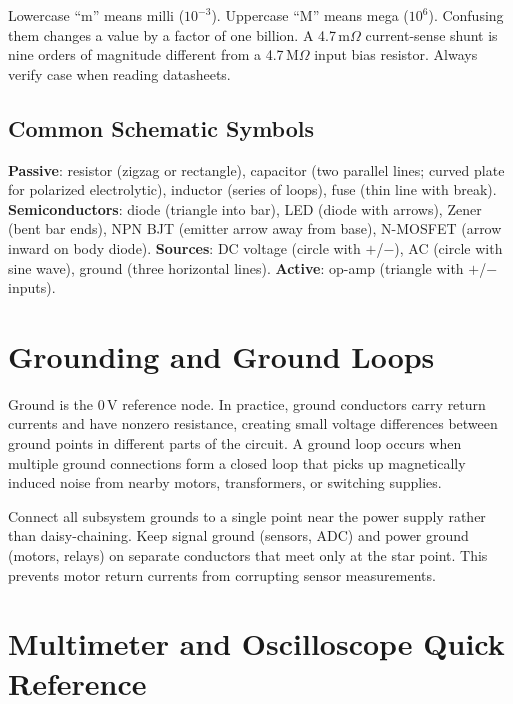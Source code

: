 \documentclass[11pt,letterpaper,twoside,openany]{book}
\begin{document}
\begin{warningbox}
Lowercase ``m'' means milli ($10^{-3}$). Uppercase ``M'' means mega ($10^{6}$). Confusing them changes a value by a factor of one billion. A 4.7\,m$\Omega$ current-sense shunt is nine orders of magnitude different from a 4.7\,M$\Omega$ input bias resistor. Always verify case when reading datasheets.
\end{warningbox}

\subsection{Common Schematic Symbols}
\textbf{Passive}: resistor (zigzag or rectangle), capacitor (two parallel lines; curved plate for polarized electrolytic), inductor (series of loops), fuse (thin line with break). \textbf{Semiconductors}: diode (triangle into bar), LED (diode with arrows), Zener (bent bar ends), NPN BJT (emitter arrow away from base), N-MOSFET (arrow inward on body diode). \textbf{Sources}: DC voltage (circle with $+$/$-$), AC (circle with sine wave), ground (three horizontal lines). \textbf{Active}: op-amp (triangle with $+$/$-$ inputs).


\section{Grounding and Ground Loops}

Ground is the 0\,V reference node. In practice, ground conductors carry return currents and have nonzero resistance, creating small voltage differences between ground points in different parts of the circuit. A ground loop occurs when multiple ground connections form a closed loop that picks up magnetically induced noise from nearby motors, transformers, or switching supplies.

\begin{tipbox}
Connect all subsystem grounds to a single point near the power supply rather than daisy-chaining. Keep signal ground (sensors, ADC) and power ground (motors, relays) on separate conductors that meet only at the star point. This prevents motor return currents from corrupting sensor measurements.
\end{tipbox}


\section{Multimeter and Oscilloscope Quick Reference}
\end{document}
